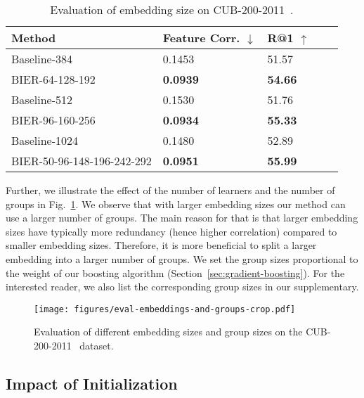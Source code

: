 \documentclass[10pt,journal,compsoc]{IEEEtran}
\begin{document}
\begin{table}[htbp]
\caption{Evaluation of embedding size on CUB-200-2011~\cite{WahCUB_200_2011}.}
\label{tbl:eval-embedding-sizes}
\renewcommand{\arraystretch}{1.3}
\centering
\begin{tabular}{lllll}
\hline
Method                        & Feature Corr. $\downarrow$    & R@1 $\uparrow$           \\
\hline
Baseline-384                  & 0.1453           & 51.57          \\
BIER-64-128-192               & \textbf{0.0939}  & \textbf{54.66} \\
\hline
Baseline-512                  &  0.1530          & 51.76         \\
BIER-96-160-256               & \textbf{0.0934}  & \textbf{55.33}  \\
\hline
Baseline-1024                 & 0.1480           & 52.89         \\
BIER-50-96-148-196-242-292    & \textbf{0.0951}  & \textbf{55.99} \\
\hline
\end{tabular}
\end{table}

Further, we illustrate the effect of the number of learners and the number of groups in Fig.~\ref{fig:embedding-size-evaluation}. We observe that 
with larger embedding sizes our method can use a larger number of groups. The main reason for that is that
larger embedding sizes have typically more redundancy (hence higher correlation) compared to smaller embedding sizes. Therefore, it is more beneficial to split 
a larger embedding into a larger number of groups. We set the group sizes proportional to the weight of our boosting algorithm (Section~\ref{sec:gradient-boosting}). 
For the interested reader, we also list the
corresponding group sizes in our supplementary.

\begin{figure}[htbp]
    \begin{center}
    \texttt{[image: figures/eval-embeddings-and-groups-crop.pdf]}
    \end{center}
    \caption{Evaluation of different embedding sizes and group sizes on the CUB-200-2011~\cite{WahCUB_200_2011} dataset.}
    \label{fig:embedding-size-evaluation}
\end{figure}\subsection{Impact of Initialization}\label{sec:eval-initialization}
\end{document}
